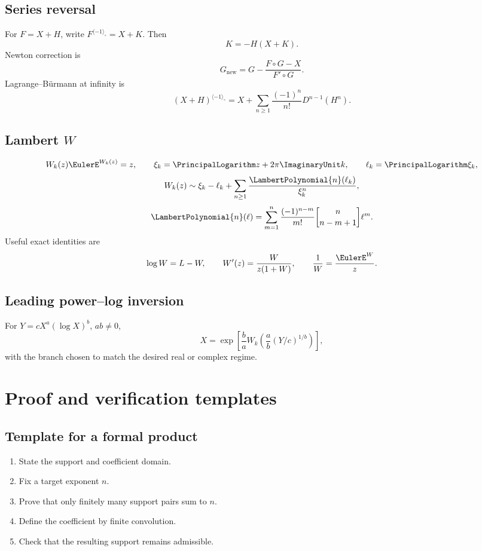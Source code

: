 \documentclass[11pt,openany]{book}
\theoremstyle{definition}
\theoremstyle{plain}
\theoremstyle{remark}
\newcommand{\invcomp}{^{\langle -1\rangle_{\circ}}}
\newcommand{\stirlingone}[2]{\genfrac{[}{]}{0pt}{}{#1}{#2}}
\begin{document}
\section{Series reversal}
For \(F=X+H\), write \(F\invcomp=X+K\). Then
\[
 K=-H(X+K).
\]
Newton correction is
\[
 G_{\mathrm{new}}=G-\frac{F\circ G-X}{F'\circ G}.
\]
Lagrange--B\"urmann at infinity is
\[
 (X+H)\invcomp
 =X+\sum_{n\ge1}\frac{(-1)^n}{n!}D^{n-1}(H^n).
\]

\section{Lambert \texorpdfstring{\(W\)}{W}}
\[
 W_k(z)\EulerE^{W_k(z)}=z,
 \qquad
 \xi_k=\PrincipalLogarithm z+2\pi\ImaginaryUnit k,
 \qquad
 \ell_k=\PrincipalLogarithm\xi_k,
\]
\[
 W_k(z)\sim\xi_k-\ell_k+\sum_{n\ge1}\frac{\LambertPolynomial{n}(\ell_k)}{\xi_k^n},
\]
\[
 \LambertPolynomial{n}(\ell)=\sum_{m=1}^{n}
 \frac{(-1)^{n-m}}{m!}\stirlingone{n}{n-m+1}\ell^m.
\]
Useful exact identities are
\[
 \log W=L-W,
 \qquad
 W'(z)=\frac{W}{z(1+W)},
 \qquad
 \frac1W=\frac{\EulerE^W}{z}.
\]

\section{Leading power--log inversion}
For \(Y=cX^a(\log X)^b\), \(ab\ne0\),
\[
 X=
 \exp\left[
 \frac ba W_k\left(\frac ab(Y/c)^{1/b}\right)
 \right],
\]
with the branch chosen to match the desired real or complex regime.

\chapter{Proof and verification templates}\label{app:proof-templates}

\section{Template for a formal product}
\begin{enumerate}
\item State the support and coefficient domain.
\item Fix a target exponent \(n\).
\item Prove that only finitely many support pairs sum to \(n\).
\item Define the coefficient by finite convolution.
\item Check that the resulting support remains admissible.
\end{enumerate}
\end{document}
